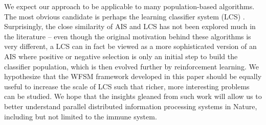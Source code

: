 \documentclass{llncs}
\begin{document}
We expect our approach to be applicable to many population-based algorithms. The most obvious candidate is perhaps the learning classifier system (LCS) \cite{Urbanowicz2009}. Surprisingly, the close similarity of AIS and LCS has not been explored much in the literature -- even though the original motivation behind these algorithms is very different, a LCS can in fact be viewed as a more sophisticated version of an AIS where positive or negative selection is only an initial step to build the classifier population, which is then evolved further by reinforcement learning. We hypothesize that the WFSM framework developed in this paper should be equally useful to increase the scale of LCS such that richer, more interesting problems can be studied. We hope that the insights gleaned from such work will allow us to better understand 
parallel distributed information processing systems in Nature, including but not limited to the immune 
system.


\end{document}
